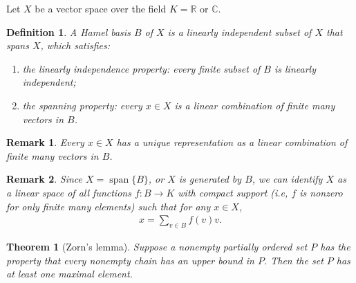 \documentclass[11pt]{book}
\newtheorem{definition}{Definition}[chapter]
\newtheorem{theorem}{Theorem}[chapter]
\newtheorem{remark}{Remark}[chapter]
\theoremstyle{definition}
\numberwithin{equation}{chapter}
\begin{document}
Let $X$ be a vector space over the field $K = \mathbb{R}$ or $\mathbb{C}$.

\medskip

\begin{definition}
A Hamel basis $B$ of $X$ is a linearly independent subset of $X$ that spans $X$, which satisfies:
\begin{enumerate}[label=(\alph*)]
    \item the linearly independence property: every finite subset of $B$ is linearly independent;
    
    \item the spanning property: every $x \in X$ is a linear combination of finite many vectors in $B$.
\end{enumerate}
\end{definition}

\begin{remark}
Every $x \in X$ has a unique representation as a linear combination of finite many vectors in $B$.
\end{remark}


\begin{remark}
Since $X = \operatorname{span} \{B\}$, or $X$ is generated by $B$, we can identify $X$ as a linear space of all functions $f: B \to K$ with compact support (i.e, $f$ is nonzero for only finite many elements) such that for any $x \in X$,
\begin{align*}
    x = \sum_{v \in B} f(v) v.
\end{align*}
\end{remark}

\medskip

\begin{theorem}[Zorn's lemma]\label{th_157}
Suppose a nonempty partially ordered set $P$ has the property that every nonempty chain has an upper bound in $P$. Then the set $P$ has at least one maximal element.
\end{theorem}

\medskip
\end{document}
